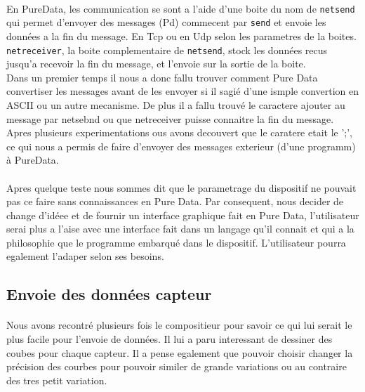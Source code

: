 \documentclass[a4paper, titlepage, oneside, 12pt]{article}%
\begin{document}
\paragraph{}
En PureData, les communication se sont a l'aide d'une boite du nom de \texttt{netsend} qui permet d'envoyer des messages (Pd) commecent par \texttt{send} et envoie les données a la fin du message. En Tcp ou en Udp selon les parametres de la boites.\\
\texttt{netreceiver}, la boite complementaire de \texttt{netsend}, stock les données recus jusqu'a recevoir la fin du message, et l'envoie sur la sortie de la boite.\\
Dans un premier temps il nous a donc fallu trouver comment Pure Data convertiser les messages avant de les envoyer si il sagié d'une ismple convertion en ASCII ou un autre  mecanisme. De plus il a fallu trouvé le caractere ajouter au message par netsebnd ou que netreceiver puisse connaitre la fin du message.\\
Apres plusieurs experimentations ous avons decouvert que le caratere etait le ';', ce qui nous a permis de faire d'envoyer des messages exterieur (d'une programm) à PureData.

\paragraph{}
Apres quelque teste nous sommes dit que le parametrage du dispositif ne pouvait pas ce faire sans connaissances en Pure Data. Par consequent, nous decider de change d'idéee et de fournir un interface graphique fait en Pure Data, l'utilisateur serai plus a l'aise avec une interface fait dans un langage qu'il connait et qui a la philosophie que le programme embarqué dans le dispositif. L'utilisateur pourra egalement l'adaper selon ses besoins.
\subsection{Envoie des données capteur}
\paragraph{}
Nous avons recontré plusieurs fois le compositieur pour savoir ce qui lui serait le plus facile pour l'envoie de données. Il lui a paru interessant de dessiner des coubes pour chaque capteur. Il a pense egalement que pouvoir choisir changer la précision des courbes pour pouvoir similer de grande variations ou au contraire des tres petit variation.\\
\end{document}
